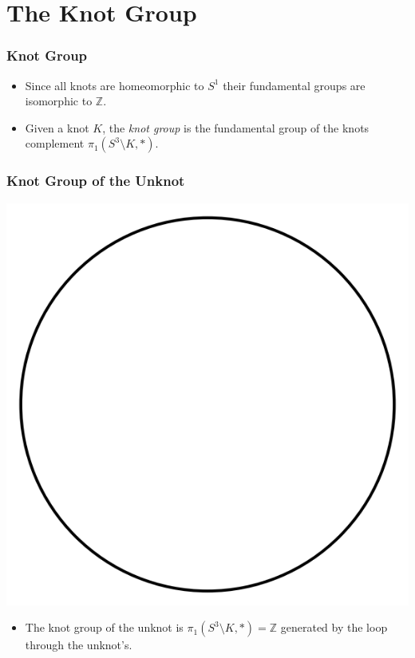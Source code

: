 \documentclass{beamer}
\begin{document}
\section{The Knot Group}

\begin{frame}
  \frametitle{Knot Group}
  \begin{itemize}
  \item Since all knots are homeomorphic to $S^1$ their
    fundamental groups are isomorphic to $\mathbb{Z}$.
    \pause
  \item Given a knot $K$, the \textit{knot group} is
    the fundamental group of the knots complement  $\pi_1(S^3\setminus K,*)$.
  \end{itemize}
\end{frame}

\begin{frame}
  \frametitle{Knot Group of the Unknot}
  \begin{center}
    \includegraphics[scale=.3]{unknot}
  \end{center}
  \begin{itemize}
    \pause
  \item The knot group of the unknot is
    $\pi_1(S^3\setminus K,*)=\mathbb{Z}$ generated by the loop through the
    unknot's.
  \end{itemize}
\end{frame}
\end{document}
